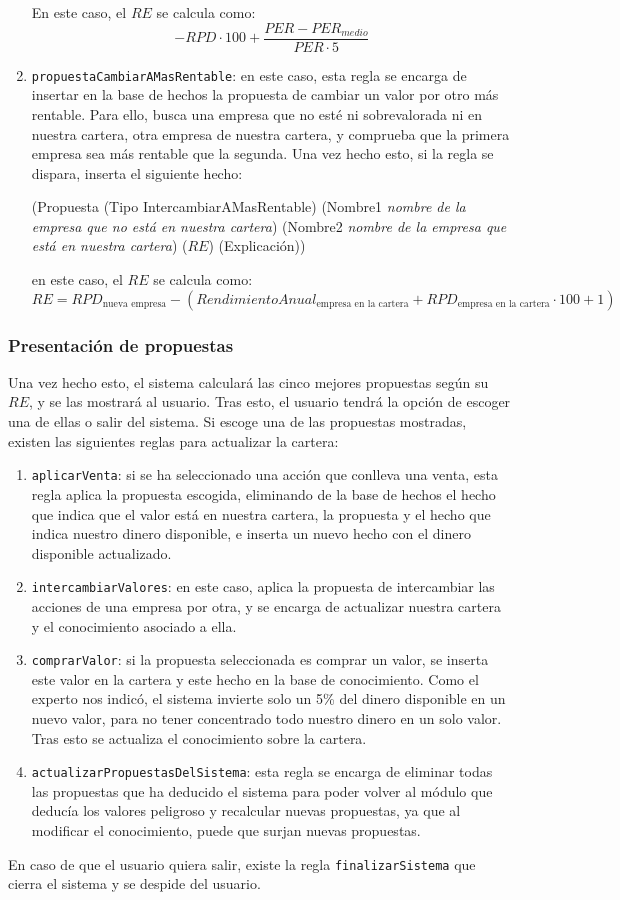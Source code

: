 \documentclass[10pt,spanish]{article}
\theoremstyle{plain}
\theoremstyle{definition}
\begin{document}
\begin{enumerate}[---]
    En este caso, el $RE$ se calcula como:$$ -RPD\cdot100 + \frac{PER - PER_{medio}}{PER \cdot 5}$$
    \item \texttt{propuestaCambiarAMasRentable}: en este caso, esta regla se encarga de insertar en la base de hechos la propuesta de cambiar un valor por otro más rentable. Para ello, busca una empresa que no esté ni sobrevalorada ni en nuestra cartera, otra empresa de nuestra cartera, y comprueba que la primera empresa sea más rentable que la segunda. Una vez hecho esto, si la regla se dispara, inserta el siguiente hecho:
    \begin{center}
        (Propuesta (Tipo IntercambiarAMasRentable) (Nombre1 \textit{nombre de la empresa que no está en nuestra cartera}) (Nombre2 \textit{nombre de la empresa que está en nuestra cartera}) ($RE$) (Explicación))
    \end{center}
    en este caso, el $RE$ se calcula como:
    $$RE = RPD_{\text{nueva empresa}} - (RendimientoAnual_{\text{empresa en la cartera}} +  RPD_{\text{empresa en la cartera}}\cdot 100 + 1)$$ 
\end{enumerate}

\subsubsection{Presentación de propuestas}

Una vez hecho esto, el sistema calculará las cinco mejores propuestas según su $RE$, y se las mostrará al usuario. Tras esto, el usuario tendrá la opción de escoger una de ellas o salir del sistema. Si escoge una de las propuestas mostradas, existen las siguientes reglas para actualizar la cartera:

\begin{enumerate}[---]
    \item \texttt{aplicarVenta}: si se ha seleccionado una acción que conlleva una venta, esta regla aplica la propuesta escogida, eliminando de la base de hechos el hecho que indica que el valor está en nuestra cartera, la propuesta y el hecho que indica nuestro dinero disponible, e inserta un nuevo hecho con el dinero disponible actualizado.
    \item \texttt{intercambiarValores}: en este caso, aplica la propuesta de intercambiar las acciones de una empresa por otra, y se encarga de actualizar nuestra cartera y el conocimiento asociado a ella.
    \item \texttt{comprarValor}: si la propuesta seleccionada es comprar un valor, se inserta este valor en la cartera y este hecho en la base de conocimiento. Como el experto nos indicó, el sistema invierte solo un 5\% del dinero disponible en un nuevo valor, para no tener concentrado todo nuestro dinero en un solo valor. Tras esto se actualiza el conocimiento sobre la cartera.
    \item \texttt{actualizarPropuestasDelSistema}: esta regla se encarga de eliminar todas las propuestas que ha deducido el sistema para poder volver al módulo que deducía los valores peligroso y recalcular nuevas propuestas, ya que al modificar el conocimiento, puede que surjan nuevas propuestas.
\end{enumerate}

En caso de que el usuario quiera salir, existe la regla \texttt{finalizarSistema} que cierra el sistema y se despide del usuario.
\end{document}
